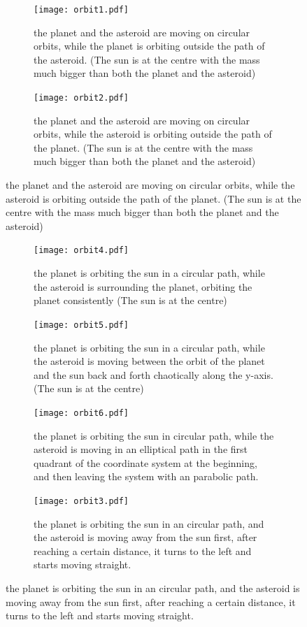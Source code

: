 \begin{figure}[h]
    \centering %
\begin{subfigure}{0.4\textwidth}
  \texttt{[image: orbit1.pdf]}
  \caption{the planet and the asteroid are moving on circular orbits, while the planet is orbiting outside the path of the asteroid. (The sun is at the centre with the mass much bigger than both the planet and the asteroid)}
  \label{fig:1}
\end{subfigure}\hfil %
\begin{subfigure}{0.4\textwidth}
  \texttt{[image: orbit2.pdf]}
  \caption{the planet and the asteroid are moving on circular orbits, while the asteroid is orbiting outside the path of the planet. (The sun is at the centre with the mass much bigger than both the planet and the asteroid)}
  \label{fig:2}
\end{subfigure}\hfil %
\end{figure}

\begin{figure}[p]
    \centering %
\begin{subfigure}{0.4\textwidth}
  \texttt{[image: orbit4.pdf]}
  \caption{the planet is orbiting the sun in a circular path, while the asteroid is surrounding the planet, orbiting the planet consistently (The sun is at the centre)}
  \label{fig:4}
\end{subfigure}\hfil %
\begin{subfigure}{0.4\textwidth}
  \texttt{[image: orbit5.pdf]}
  \caption{the planet is orbiting the sun in a circular path, while the asteroid is moving between the orbit of the planet and the sun back and forth chaotically along the y-axis. (The sun is at the centre)}
  \label{fig:5}
\end{subfigure}\hfil %

\medskip
\begin{subfigure}{0.4\textwidth}
  \texttt{[image: orbit6.pdf]}
  \caption{the planet is orbiting the sun in circular path, while the asteroid is moving in an elliptical path in the first quadrant of the coordinate system at the beginning, and then leaving the system with an parabolic path. }
  \label{fig:4}
\end{subfigure}\hfil %
\begin{subfigure}{0.4\textwidth}
  \texttt{[image: orbit3.pdf]}
  \caption{the planet is orbiting the sun in an circular path, and the asteroid is moving away from the sun first, after reaching a certain distance, it turns to the left and starts moving straight.}
  \label{fig:5}
\end{subfigure}\hfil %

\label{restricted three-body images}
\end{figure}

